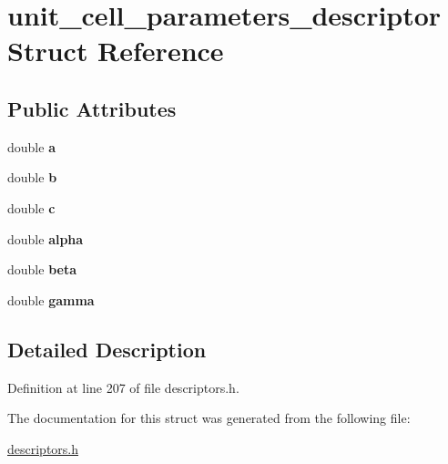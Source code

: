 \hypertarget{structunit__cell__parameters__descriptor}{}\section{unit\+\_\+cell\+\_\+parameters\+\_\+descriptor Struct Reference}
\label{structunit__cell__parameters__descriptor}
\subsection*{Public Attributes}
\begin{DoxyCompactItemize}
\item 
\hypertarget{structunit__cell__parameters__descriptor_afde56a0358a824b5954bcceaad366129}{}double {\bfseries a}\label{structunit__cell__parameters__descriptor_afde56a0358a824b5954bcceaad366129}

\item 
\hypertarget{structunit__cell__parameters__descriptor_af492c0e299b63dad48e9b5dee5915be2}{}double {\bfseries b}\label{structunit__cell__parameters__descriptor_af492c0e299b63dad48e9b5dee5915be2}

\item 
\hypertarget{structunit__cell__parameters__descriptor_ad617501a0f53f505363e1e73ed83aba2}{}double {\bfseries c}\label{structunit__cell__parameters__descriptor_ad617501a0f53f505363e1e73ed83aba2}

\item 
\hypertarget{structunit__cell__parameters__descriptor_aaef78cbb800ffec9f27ae4d4992854be}{}double {\bfseries alpha}\label{structunit__cell__parameters__descriptor_aaef78cbb800ffec9f27ae4d4992854be}

\item 
\hypertarget{structunit__cell__parameters__descriptor_a8af57dd55ffba6d3e08225b3e3ef1101}{}double {\bfseries beta}\label{structunit__cell__parameters__descriptor_a8af57dd55ffba6d3e08225b3e3ef1101}

\item 
\hypertarget{structunit__cell__parameters__descriptor_a8a07b157b796dee17e7b2cdad92d0144}{}double {\bfseries gamma}\label{structunit__cell__parameters__descriptor_a8a07b157b796dee17e7b2cdad92d0144}

\end{DoxyCompactItemize}


\subsection{Detailed Description}


Definition at line 207 of file descriptors.\+h.



The documentation for this struct was generated from the following file\+:\begin{DoxyCompactItemize}
\item 
\hyperlink{descriptors_8h}{descriptors.\+h}\end{DoxyCompactItemize}
